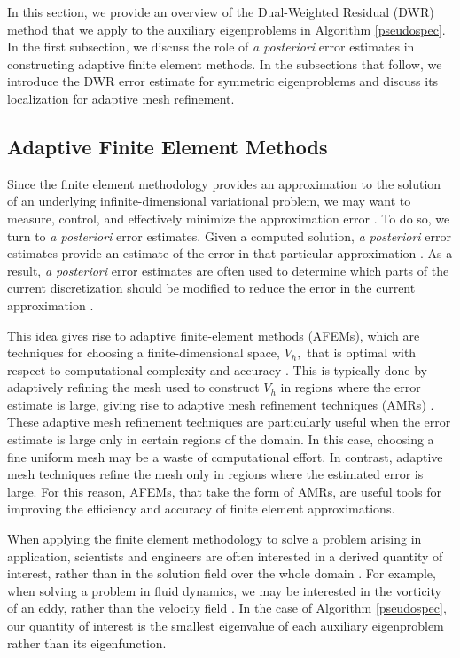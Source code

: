In this section, we provide an overview of the Dual-Weighted Residual (DWR) method that we apply to the auxiliary eigenproblems in Algorithm \ref{pseudospec}. In the first subsection, we discuss the role of \textit{a posteriori} error estimates in constructing adaptive finite element methods. In the subsections that follow, we introduce the DWR error estimate for symmetric eigenproblems and discuss its localization for adaptive mesh refinement.

\subsection{Adaptive Finite Element Methods}

Since the finite element methodology provides an approximation to the solution of an underlying infinite-dimensional variational problem, we may want to measure, control, and effectively minimize the approximation error \cite{Oden}. To do so, we turn to \textit{a posteriori} error estimates. Given a computed solution, \textit{a posteriori} error estimates provide an estimate of the error in that particular approximation \cite{Scott}. As a result, \textit{a posteriori} error estimates are often used to determine which parts of the current discretization should be modified to reduce the error in the current approximation \cite{Scott}. 

This idea gives rise to adaptive finite-element methods (AFEMs), which are techniques for choosing a finite-dimensional space, $V_h,$ that is optimal with respect to computational complexity and accuracy \cite{Scott}. This is typically done by adaptively refining the mesh used to construct $V_h$ in regions where the error estimate is large, giving rise to adaptive mesh refinement techniques (AMRs) \cite{Scott}. 
These adaptive mesh refinement techniques are particularly useful when the error estimate is large only in certain regions of the domain. In this case, choosing a fine uniform mesh may be a waste of computational effort. In contrast, adaptive mesh techniques refine the mesh only in regions where the estimated error is large. For this reason, AFEMs, that take the form of AMRs, are useful tools for improving the efficiency and accuracy of finite element approximations.

When applying the finite element methodology to solve a problem arising in application, scientists and engineers are often interested in a derived quantity of interest, rather than in the solution field over the whole domain \cite{joe}. For example, when solving a problem in fluid dynamics, we may be interested in the vorticity of an eddy, rather than the velocity field \cite{Scott}. In the case of Algorithm \ref{pseudospec}, our quantity of interest is the smallest eigenvalue of each auxiliary eigenproblem rather than its eigenfunction.

